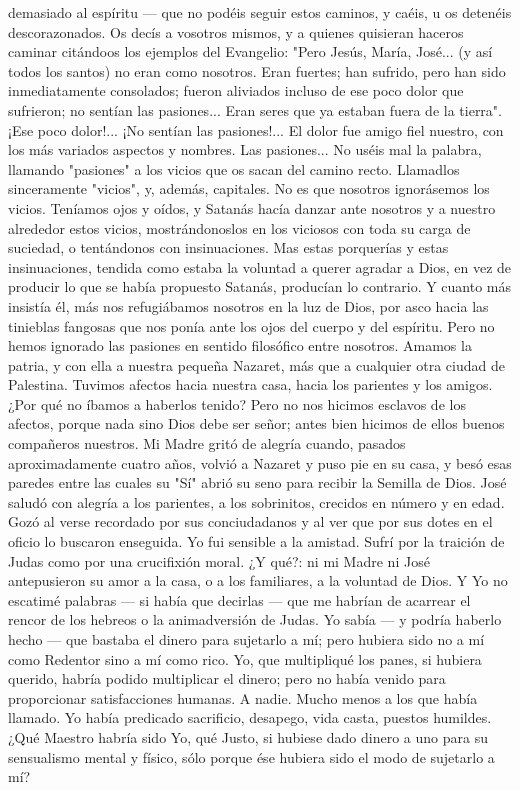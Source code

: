 \documentclass[12pt]{book} %
\begin{document}
demasiado al espíritu — que no podéis seguir estos caminos, y caéis, u os detenéis descorazonados. Os decís a vosotros mismos, y a quienes quisieran haceros caminar citándoos los ejemplos del Evangelio: "Pero Jesús, María, José... (y así todos los santos) no eran como nosotros. Eran fuertes; han sufrido, pero han sido inmediatamente consolados; fueron aliviados incluso de ese poco dolor que sufrieron; no sentían las pasiones... Eran seres que ya estaban fuera de la tierra". 
¡Ese poco dolor!... ¡No sentían las pasiones!... 
El dolor fue amigo fiel nuestro, con los más variados aspectos y nombres. 
Las pasiones... No uséis mal la palabra, llamando "pasiones" a los vicios que os sacan del camino recto. Llamadlos 
sinceramente "vicios", y, además, capitales. No es que nosotros ignorásemos los vicios. Teníamos ojos y oídos, y Satanás hacía danzar ante nosotros y a nuestro alrededor estos vicios, mostrándonoslos en los viciosos con toda su carga de suciedad, o tentándonos con insinuaciones. Mas estas porquerías y estas insinuaciones, tendida como estaba la voluntad a querer agradar a Dios, en vez de producir lo que se había propuesto Satanás, producían lo contrario. Y cuanto más insistía él, más nos refugiábamos nosotros en la luz de Dios, por asco hacia las tinieblas fangosas que nos ponía ante los ojos del cuerpo y del espíritu. 
Pero no hemos ignorado las pasiones en sentido filosófico entre nosotros. Amamos la patria, y con ella a nuestra pequeña Nazaret, más que a cualquier otra ciudad de Palestina. Tuvimos afectos hacia nuestra casa, hacia los parientes y los amigos. ¿Por qué no íbamos a haberlos tenido? Pero no nos hicimos esclavos de los afectos, porque nada sino Dios debe ser señor; antes bien hicimos de ellos buenos compañeros nuestros. 
Mi Madre gritó de alegría cuando, pasados aproximadamente cuatro años, volvió a Nazaret y puso pie en su casa, y 
besó esas paredes entre las cuales su "Sí" abrió su seno para recibir la Semilla de Dios. José saludó con alegría a los parientes, a los sobrinitos, crecidos en número y en edad. Gozó al verse recordado por sus conciudadanos y al ver que por sus dotes en el oficio lo buscaron enseguida. Yo fui sensible a la amistad. Sufrí por la traición de Judas como por una crucifixión moral. ¿Y qué?: ni mi Madre ni José antepusieron su amor a la casa, o a los familiares, a la voluntad de Dios.      
Y Yo no escatimé palabras — si había que decirlas — que me habrían de acarrear el rencor de los hebreos o la 
animadversión de Judas. Yo sabía — y podría haberlo hecho — que bastaba el dinero para sujetarlo a mí; pero hubiera sido no a mí como Redentor sino a mí como rico. Yo, que multipliqué los panes, si hubiera querido, habría podido multiplicar el dinero; pero no había venido para proporcionar satisfacciones humanas. A nadie. Mucho menos a los que había llamado. Yo había predicado sacrificio, desapego, vida casta, puestos humildes. ¿Qué Maestro habría sido Yo, qué Justo, si hubiese dado dinero a uno para su sensualismo mental y físico, sólo porque ése hubiera sido el modo de sujetarlo a mí? 
\end{document}

